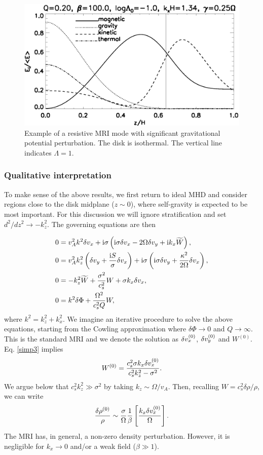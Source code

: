 \begin{figure}
  \includegraphics[width=\linewidth]{figures/result_resis_sg}
  \caption{Example of a resistive MRI mode with significant
    gravitational potential perturbation. The disk is isothermal. 
    The vertical line
    indicates $\Lambda=1$.  
    \label{mri_massive_resis}}
\end{figure}

\subsubsection{Qualitative interpretation} 
To make sense of the above results, we first return to ideal MHD and 
consider regions close to the disk midplane ($z\sim 0$), where
self-gravity is expected to be most important. For this discussion we
will ignore stratification and set $d^2/dz^2\to -k_z^2$. The governing
equations are then 

\begin{align}
  &  0= v_A^2k^2\delta v_x + \mathrm{i}\sigma\left(\mathrm{i}\sigma \delta v_x - 2\Omega\delta v_y + \mathrm{i} k_x \widetilde{W}\right),\label{simp1}\\
  &  0= v_A^2k_z^2\left(\delta v_y + \frac{\mathrm{i} S
  }{\sigma}\delta v_x\right) + \mathrm{i}\sigma\left(\mathrm{i}\sigma\delta v_y +
  \frac{\kappa^2}{2\Omega}\delta v_x\right),\label{simp2}\\
  & 0 = -k_z^2\widetilde{W} + \frac{\sigma^2}{c_s^2}W + \sigma k_x \delta v_x, \label{simp3}\\
  & 0 = k^2\delta \Phi + \frac{\Omega^2}{c_s^2Q}W,\label{simp4}
\end{align}
where $k^2 = k_z^2 + k_x^2$. We imagine an iterative procedure to
solve the above equations, starting from the Cowling approximation
where $\delta\Phi\to0$ and $Q\to\infty$. This is the standard MRI and we denote the
solution as $\delta v_x^{(0)}$, $\delta v_y^{(0)}$ and $W^{(0)}$. Eq. \ref{simp3} implies
\begin{align}
  W^{(0)} = \frac{c_s^2\sigma k_x \delta v_x^{(0)}}{c_s^2k_z^2 - \sigma^2}. 
\end{align}
We argue below that $c_s^2k_z^2\gg \sigma^2$ by taking $k_z\sim
\Omega/v_A$. Then, recalling $W=c_s^2\delta\rho/\rho$, we can write
\begin{align}
  \frac{\delta\rho^{(0)}}{\rho} \sim
  \frac{\sigma}{\Omega}\frac{1}{\beta}\left[\frac{k_x\delta v_x^{(0)}}{\Omega}\right].   
\end{align}
The MRI has, in general, a non-zero density perturbation. However, it
is negligible for $k_x\to 0$ and/or a weak field ($\beta \gg 1$). 


